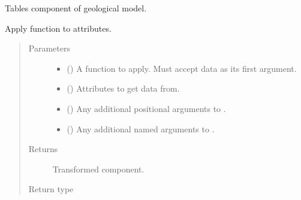 \documentclass[letterpaper,10pt,english]{sphinxmanual}
\begin{document}
\begin{fulllineitems}
\label{\detokenize{api/tables:geology.src.Tables}}
Tables component of geological model.

\begin{fulllineitems}
\label{\detokenize{api/tables:geology.src.Tables.apply}}
Apply function to attributes.
\begin{quote}\begin{description}
\item[{Parameters}] \leavevmode\begin{itemize}
\item {} 
 () \textendash{} A function to apply. Must accept data as its first argument.

\item {} 
 (\sphinxstyleliteralemphasis{\sphinxupquote{, }}) \textendash{} Attributes to get data from.

\item {} 
 () \textendash{} Any additional positional arguments to .

\item {} 
 () \textendash{} Any additional named arguments to .

\end{itemize}

\item[{Returns}] \leavevmode
{} \textendash{} Transformed component.

\item[{Return type}] \leavevmode
{\hyperref[\detokenize{api/base_classes:geology.src.base_component.BaseComponent}]{}}


\end{description}
\end{quote}
\end{fulllineitems}
\end{fulllineitems}
\end{document}

